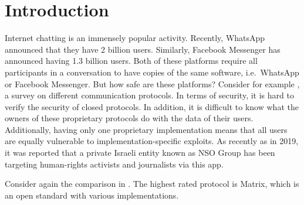 \section{Introduction}

Internet chatting is an immensely popular activity.
Recently, WhatsApp announced that they have 2 billion users\cite{whatsapp_2b_users_archive_org}.
Similarly, Facebook Messenger has announced having 1.3 billion users\cite{messenger_1pt3b_users}.
Both of these platforms require all participants in a conversation to have copies of the same software, i.e.~WhatsApp or Facebook Messenger.
But how safe are these platforms?
Consider for example \cite{digital_comms_protocols_2019}, a survey on different communication protocols.
In terms of security, it is hard to verify the security of closed protocols.
In addition, it is difficult to know what the owners of these proprietary protocols do with the data of their users.
Additionally, having only one proprietary implementation means that all users are equally vulnerable to implementation-specific exploits.
As recently as in 2019, it was reported that a private Israeli entity known as NSO Group has been targeting human-rights activists and journalists via this app\cite{nytimes_nso_group}.



Consider again the comparison in \cite{digital_comms_protocols_2019}.
The highest rated protocol is Matrix\cite{matrix_org}, which is an open standard with various implementations.

